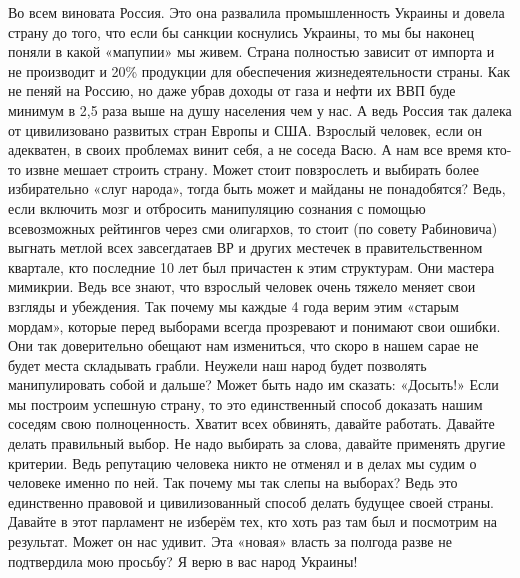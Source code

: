 \begin{itemize}
Во всем виновата Россия. Это она развалила промышленность Украины и довела
страну до того, что если бы санкции коснулись Украины, то мы бы наконец поняли
в какой «мапупии» мы живем. Страна полностью зависит от импорта и не производит
и 20\% продукции для обеспечения жизнедеятельности страны. Как не пеняй на
Россию, но даже убрав доходы от газа и нефти их ВВП буде минимум в 2,5 раза
выше на душу населения чем у нас. А ведь Россия так далека от цивилизовано
развитых стран Европы и США. Взрослый человек, если он адекватен, в своих
проблемах винит себя, а не соседа Васю. А нам все время кто-то извне мешает
строить страну. Может стоит повзрослеть и выбирать более избирательно «слуг
народа», тогда быть может и майданы не понадобятся? Ведь, если включить мозг и
отбросить манипуляцию сознания с помощью всевозможных рейтингов через сми
олигархов, то стоит (по совету Рабиновича) выгнать метлой всех завсегдатаев ВР
и других местечек в правительственном квартале, кто последние 10 лет был
причастен к этим структурам. Они мастера мимикрии. Ведь все знают, что взрослый
человек очень тяжело меняет свои взгляды и убеждения. Так почему мы каждые 4
года верим этим «старым мордам», которые перед выборами всегда прозревают и
понимают свои ошибки. Они так доверительно обещают нам измениться, что скоро в
нашем сарае не будет места складывать грабли. Неужели наш народ будет позволять
манипулировать собой и дальше? Может быть надо им сказать: «Досыть!» Если мы
построим успешную страну, то это единственный способ доказать нашим соседям
свою полноценность. Хватит всех обвинять, давайте работать. Давайте делать
правильный выбор. Не надо выбирать за слова, давайте применять другие критерии.
Ведь репутацию человека никто не отменял и в делах мы судим о человеке именно
по ней. Так почему мы так слепы на выборах? Ведь это единственно правовой и
цивилизованный способ делать будущее своей страны. Давайте в этот парламент не
изберём тех, кто хоть раз там был и посмотрим на результат. Может он нас
удивит. Эта «новая» власть за полгода разве не подтвердила мою просьбу? Я верю
в вас народ Украины!

\end{itemize} %
